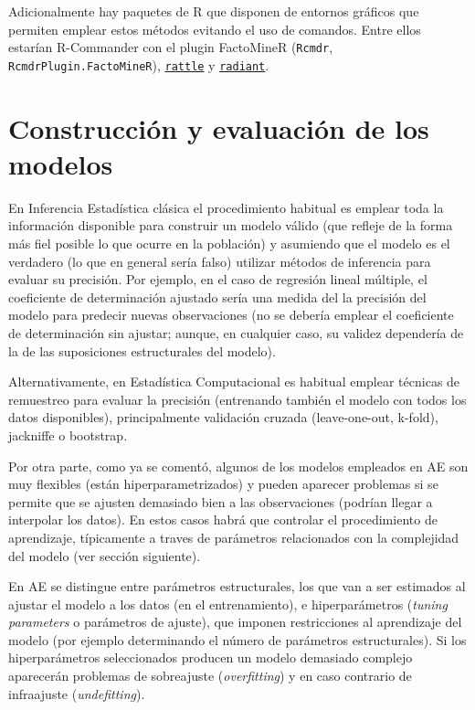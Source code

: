 \documentclass[
  spanish,
]{book}
\theoremstyle{break}
\theoremstyle{definition}
\theoremstyle{definition}
\theoremstyle{definition}
\theoremstyle{remark}
\begin{document}
Adicionalmente hay paquetes de R que disponen de entornos gráficos que permiten emplear estos métodos evitando el uso de comandos.
Entre ellos estarían R-Commander con el plugin FactoMineR (\texttt{Rcmdr}, \texttt{RcmdrPlugin.FactoMineR}), \href{https://rattle.togaware.com}{\texttt{rattle}} y \href{https://github.com/radiant-rstats/radiant}{\texttt{radiant}}.

\hypertarget{const-eval}{%
\section{Construcción y evaluación de los modelos}\label{const-eval}}

En Inferencia Estadística clásica el procedimiento habitual es emplear toda la información disponible para construir un modelo válido (que refleje de la forma más fiel posible lo que ocurre en la población) y asumiendo que el modelo es el verdadero (lo que en general sería falso) utilizar métodos de inferencia para evaluar su precisión.
Por ejemplo, en el caso de regresión lineal múltiple, el coeficiente de determinación ajustado sería una medida del la precisión del modelo para predecir nuevas observaciones (no se debería emplear el coeficiente de determinación sin ajustar; aunque, en cualquier caso, su validez dependería de la de las suposiciones estructurales del modelo).

Alternativamente, en Estadística Computacional es habitual emplear técnicas de remuestreo para evaluar la precisión (entrenando también el modelo con todos los datos disponibles), principalmente validación cruzada (leave-one-out, k-fold), jackniffe o bootstrap.

Por otra parte, como ya se comentó, algunos de los modelos empleados en AE son muy flexibles (están hiperparametrizados) y pueden aparecer problemas si se permite que se ajusten demasiado bien a las observaciones (podrían llegar a interpolar los datos).
En estos casos habrá que controlar el procedimiento de aprendizaje, típicamente a traves de parámetros relacionados con la complejidad del modelo (ver sección siguiente).

En AE se distingue entre parámetros estructurales, los que van a ser estimados al ajustar el modelo a los datos (en el entrenamiento), e hiperparámetros (\emph{tuning parameters} o parámetros de ajuste), que imponen restricciones al aprendizaje del modelo (por ejemplo determinando el número de parámetros estructurales).
Si los hiperparámetros seleccionados producen un modelo demasiado complejo aparecerán problemas de sobreajuste (\emph{overfitting}) y en caso contrario de infraajuste (\emph{undefitting}).
\end{document}
